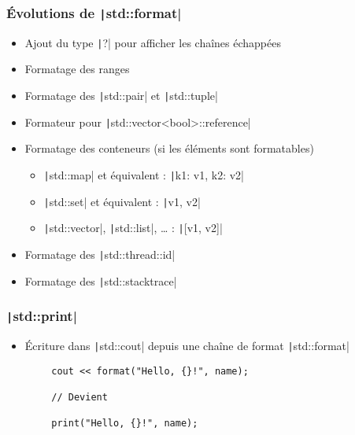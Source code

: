 \documentclass[C++.tex]{subfiles}
\begin{document}
\begin{frame}[fragile]
	\frametitle{Évolutions de \texttt|std::format|}
	\begin{itemize}
		\item Ajout du type \texttt|?| pour afficher les chaînes échappées
		\item Formatage des ranges
		\item Formatage des \texttt|std::pair| et \texttt|std::tuple|
		\item Formateur pour \texttt|std::vector<bool>::reference|
		\item Formatage des conteneurs (si les éléments sont formatables)
		\begin{itemize}
			\item \texttt|std::map| et équivalent : \texttt|{k1: v1, k2: v2}|
			\item \texttt|std::set| et équivalent : \texttt|{v1, v2}|
			\item \texttt|std::vector|, \texttt|std::list|, \ldots{} : \texttt|[v1, v2]|
		\end{itemize}
		\item Formatage des \texttt|std::thread::id|
		\item Formatage des \texttt|std::stacktrace|
	\end{itemize}
\end{frame}

\begin{frame}[fragile]
	\frametitle{\texttt|std::print|}
	\begin{itemize}
		\item Écriture dans \texttt|std::cout| depuis une chaîne de format \texttt|std::format|
	\end{itemize}

	\begin{verbatim}
		cout << format("Hello, {}!", name);

		// Devient

		print("Hello, {}!", name);
	\end{verbatim}
\end{frame}
\end{document}
